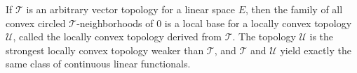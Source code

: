 If $\mathcal{T}$ is an arbitrary vector topology for a linear space $E$, then the family of all convex circled $\mathcal{T}$-neighborhoods of 0 is a local base for a locally convex topology $\mathcal{U}$, called the locally convex topology derived from $\mathcal{T}$. The topology $\mathcal{U}$ is the strongest locally convex topology weaker than $\mathcal{T}$, and $\mathcal{T}$ and $\mathcal{U}$ yield exactly the same class of continuous linear functionals.
